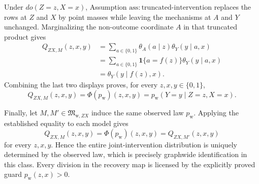 Under \(do(Z=z,X=x)\), Assumption \(\mathrm{ass:truncated\text{-}intervention}\) replaces the rows at \(Z\) and \(X\) by point masses while leaving the mechanisms at \(A\) and \(Y\) unchanged.  Marginalizing the non-outcome coordinate \(A\) in that truncated product gives
\[
\begin{aligned}
Q_{ZX,M}(z,x,y)
&=\sum_{a\in\{0,1\}}\theta_A(a\mid z)\theta_Y(y\mid a,x)\\
&=\sum_{a\in\{0,1\}}\mathbf 1\{a=f(z)\}\theta_Y(y\mid a,x)\\
&=\theta_Y(y\mid f(z),x).
\end{aligned}
\]
Combining the last two displays proves, for every \(z,x,y\in\{0,1\}\),
\[
Q_{ZX,M}(z,x,y)
=\Phi(p_{\mathrm w})(z,x,y)
=p_{\mathrm w}(Y=y\mid Z=z,X=x).
\]

Finally, let \(M,M'\in\mathfrak M_{\mathrm w,ZX}\) induce the same observed law \(p_{\mathrm w}\).  Applying the established equality to each model gives
\[
Q_{ZX,M}(z,x,y)=\Phi(p_{\mathrm w})(z,x,y)=Q_{ZX,M'}(z,x,y)
\]
for every \(z,x,y\).  Hence the entire joint-intervention distribution is uniquely determined by the observed law, which is precisely graphwide identification in this class.  Every division in the recovery map is licensed by the explicitly proved guard \(p_{\mathrm w}(z,x)>0\).
